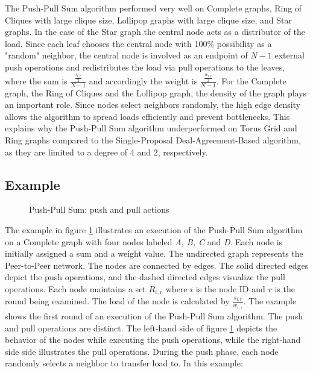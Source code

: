 The Push-Pull Sum algorithm performed very well on Complete graphs, Ring of Cliques with large clique size, Lollipop graphs with large clique size, and Star graphs. In the case of the Star graph the central node acts as a distributor of the load. Since each leaf chooses the central node with 100\% possibility as a "random" neighbor, the central node is involved as an endpoint of $N-1$ external push operations and redistributes the load via pull operations to the leaves, where the sum is $\frac{\frac{s_{i,r}}{2}}{N-1}$ and accordingly the weight is $\frac{\frac{w_{i,r}}{2}}{N-1}$. For the Complete graph, the Ring of Cliques and the Lollipop graph, the density of the graph plays an important role. Since nodes select neighbors randomly, the high edge density allows the algorithm to spread loads efficiently and prevent bottlenecks. This explains why the Push-Pull Sum algorithm underperformed on Torus Grid and Ring graphs compared to the Single-Proposal Deal-Agreement-Based algorithm, as they are limited to a degree of 4 and 2, respectively.

\subsection{Example}\label{subsec:examplePPS}
\begin{figure}
    \centering
    \scalebox{0.75}{}
    \caption{Push-Pull Sum: push and pull actions}
    \label{fig:examplePPSSetting}
\end{figure}

The example in figure \ref{fig:examplePPSSetting} illustrates an execution of the Push-Pull Sum algorithm on a Complete graph with four nodes labeled \textit{A, B, C} and \textit{D}. Each node is initially assigned a sum and a weight value. The undirected graph represents the Peer-to-Peer network. The nodes are connected by edges. The solid directed edges depict the push operations, and the dashed directed edges visualize the pull operations. Each node maintains a set $R_{i,r}$ where $i$ is the node ID and $r$ is the round being examined. The load of the node is calculated by $\frac{s_{i,r}}{w_{i,r}}$. The example shows the first round of an execution of the Push-Pull Sum algorithm. The push and pull operations are distinct. The left-hand side of figure \ref{fig:examplePPSSetting} depicts the behavior of the nodes while executing the push operations, while the right-hand side side illustrates the pull operations. During the push phase, each node randomly selects a neighbor to transfer load to. In this example:

